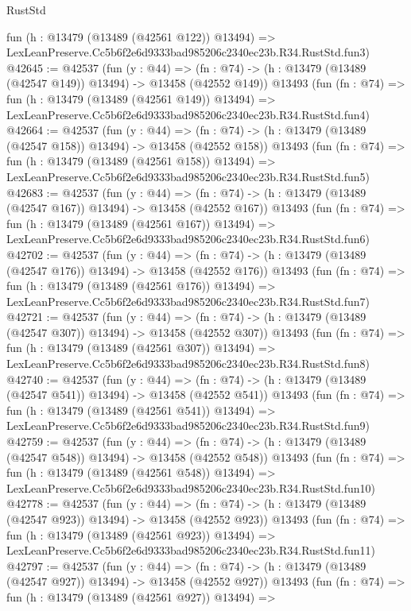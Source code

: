 \begin{lexlean}{RustStd}
\begin{coremodule}
    fun (h : @13479 (@13489 (@42561 @122)) @13494) =>
    LexLeanPreserve.Cc5b6f2e6d9333bad985206c2340ec23b.R34.RustStd.fun3)
@42645 := @42537
    (fun (y : @44) =>
    (fn : @74) -> (h : @13479 (@13489 (@42547 @149)) @13494) -> @13458 (@42552 @149))
    @13493
    (fun (fn : @74) =>
    fun (h : @13479 (@13489 (@42561 @149)) @13494) =>
    LexLeanPreserve.Cc5b6f2e6d9333bad985206c2340ec23b.R34.RustStd.fun4)
@42664 := @42537
    (fun (y : @44) =>
    (fn : @74) -> (h : @13479 (@13489 (@42547 @158)) @13494) -> @13458 (@42552 @158))
    @13493
    (fun (fn : @74) =>
    fun (h : @13479 (@13489 (@42561 @158)) @13494) =>
    LexLeanPreserve.Cc5b6f2e6d9333bad985206c2340ec23b.R34.RustStd.fun5)
@42683 := @42537
    (fun (y : @44) =>
    (fn : @74) -> (h : @13479 (@13489 (@42547 @167)) @13494) -> @13458 (@42552 @167))
    @13493
    (fun (fn : @74) =>
    fun (h : @13479 (@13489 (@42561 @167)) @13494) =>
    LexLeanPreserve.Cc5b6f2e6d9333bad985206c2340ec23b.R34.RustStd.fun6)
@42702 := @42537
    (fun (y : @44) =>
    (fn : @74) -> (h : @13479 (@13489 (@42547 @176)) @13494) -> @13458 (@42552 @176))
    @13493
    (fun (fn : @74) =>
    fun (h : @13479 (@13489 (@42561 @176)) @13494) =>
    LexLeanPreserve.Cc5b6f2e6d9333bad985206c2340ec23b.R34.RustStd.fun7)
@42721 := @42537
    (fun (y : @44) =>
    (fn : @74) -> (h : @13479 (@13489 (@42547 @307)) @13494) -> @13458 (@42552 @307))
    @13493
    (fun (fn : @74) =>
    fun (h : @13479 (@13489 (@42561 @307)) @13494) =>
    LexLeanPreserve.Cc5b6f2e6d9333bad985206c2340ec23b.R34.RustStd.fun8)
@42740 := @42537
    (fun (y : @44) =>
    (fn : @74) -> (h : @13479 (@13489 (@42547 @541)) @13494) -> @13458 (@42552 @541))
    @13493
    (fun (fn : @74) =>
    fun (h : @13479 (@13489 (@42561 @541)) @13494) =>
    LexLeanPreserve.Cc5b6f2e6d9333bad985206c2340ec23b.R34.RustStd.fun9)
@42759 := @42537
    (fun (y : @44) =>
    (fn : @74) -> (h : @13479 (@13489 (@42547 @548)) @13494) -> @13458 (@42552 @548))
    @13493
    (fun (fn : @74) =>
    fun (h : @13479 (@13489 (@42561 @548)) @13494) =>
    LexLeanPreserve.Cc5b6f2e6d9333bad985206c2340ec23b.R34.RustStd.fun10)
@42778 := @42537
    (fun (y : @44) =>
    (fn : @74) -> (h : @13479 (@13489 (@42547 @923)) @13494) -> @13458 (@42552 @923))
    @13493
    (fun (fn : @74) =>
    fun (h : @13479 (@13489 (@42561 @923)) @13494) =>
    LexLeanPreserve.Cc5b6f2e6d9333bad985206c2340ec23b.R34.RustStd.fun11)
@42797 := @42537
    (fun (y : @44) =>
    (fn : @74) -> (h : @13479 (@13489 (@42547 @927)) @13494) -> @13458 (@42552 @927))
    @13493
    (fun (fn : @74) =>
    fun (h : @13479 (@13489 (@42561 @927)) @13494) =>

\end{coremodule}
\end{lexlean}
